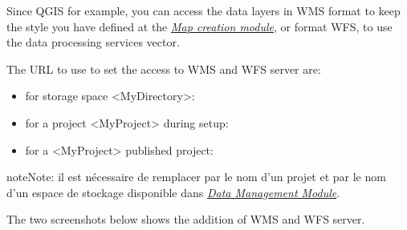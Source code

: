 \documentclass[letterpaper,10pt,english]{sphinxmanual}
\begin{document}
Since QGIS for example, you can access the data layers in WMS format to keep the style you have defined at the {\hyperref[maps/index:maps]{\emph{Map creation module}}}, or format WFS, to use the data processing services vector.

The URL to use to set the access to WMS and WFS server are:
\begin{itemize}
\item {} 
for storage space \textless{}MyDirectory\textgreater{}:


\item {} 
for a project \textless{}MyProject\textgreater{} during setup:


\item {} 
for a \textless{}MyProject\textgreater{} published project:


\end{itemize}

\begin{notice}{note}{Note:}
il est nécessaire de remplacer  par le nom d'un projet et  par le nom d'un espace de stockage disponible dans {\hyperref[data/index:data]{\emph{Data Management Module}}}.
\end{notice}

The two screenshots below shows the addition of WMS and WFS server.
\end{document}
